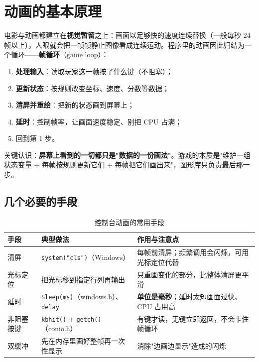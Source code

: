 
\section{动画的基本原理}
电影与动画都建立在\textbf{视觉暂留}之上：画面以足够快的速度连续替换（一般每秒 24 帧以上），人眼就会把一帧帧静止图像看成连续运动。程序里的动画因此归结为一个循环——\textbf{帧循环}（game loop）：

\begin{enumerate}
  \item \textbf{处理输入}：读取玩家这一帧按了什么键（不阻塞）；
  \item \textbf{更新状态}：按规则改变坐标、速度、分数等数据；
  \item \textbf{清屏并重绘}：把新的状态画到屏幕上；
  \item \textbf{延时}：控制帧率，让画面速度稳定、别把 CPU 占满；
  \item 回到第 1 步。
\end{enumerate}

关键认识：\textbf{屏幕上看到的一切都只是"数据的一份画法"}。游戏的本质是"维护一组状态变量 + 每帧按规则更新它们 + 每帧把它们画出来"，图形库只负责最后那一步。

\subsection{几个必要的手段}
\begin{table}[htbp]
\centering
\caption{控制台动画的常用手段}
\footnotesize
\begin{tabularx}{\textwidth}{@{}p{3.2cm}p{3.6cm}X@{}}
\toprule
手段 & 典型做法 & 作用与注意点 \\
\midrule
清屏 & \texttt{system("cls")}（Windows） & 每帧前清屏；频繁调用会闪烁，可用光标定位代替 \\
光标定位 & 把光标移到指定行列再输出 & 只重画变化的部分，比整体清屏更平滑 \\
延时 & \texttt{Sleep(ms)}（windows.h）、\texttt{delay} & \textbf{单位是毫秒}；延时太短画面过快、CPU 占用高 \\
非阻塞按键 & \texttt{kbhit()} + \texttt{getch()}（conio.h） & 有键才读，无键立即返回，不会卡住帧循环 \\
双缓冲 & 先在内存里画好整帧再一次性显示 & 消除"边画边显示"造成的闪烁 \\
\bottomrule
\end{tabularx}
\end{table}

